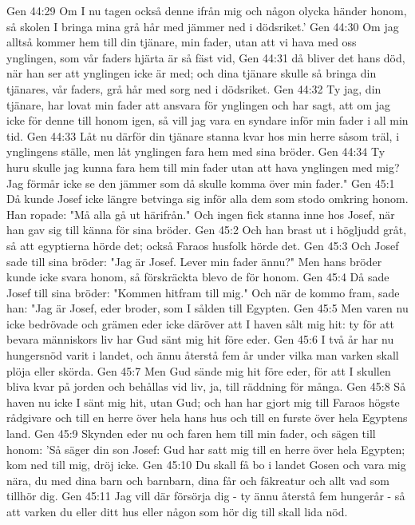 Gen 44:29  Om I nu tagen också denne ifrån mig och någon olycka händer honom, så skolen I bringa mina grå hår med jämmer ned i dödsriket.'
Gen 44:30  Om jag alltså kommer hem till din tjänare, min fader, utan att vi hava med oss ynglingen, som vår faders hjärta är så fäst vid,
Gen 44:31  då bliver det hans död, när han ser att ynglingen icke är med; och dina tjänare skulle så bringa din tjänares, vår faders, grå hår med sorg ned i dödsriket.
Gen 44:32  Ty jag, din tjänare, har lovat min fader att ansvara för ynglingen och har sagt, att om jag icke för denne till honom igen, så vill jag vara en syndare inför min fader i all min tid.
Gen 44:33  Låt nu därför din tjänare stanna kvar hos min herre såsom träl, i ynglingens ställe, men låt ynglingen fara hem med sina bröder.
Gen 44:34  Ty huru skulle jag kunna fara hem till min fader utan att hava ynglingen med mig? Jag förmår icke se den jämmer som då skulle komma över min fader."
Gen 45:1  Då kunde Josef icke längre betvinga sig inför alla dem som stodo omkring honom. Han ropade: "Må alla gå ut härifrån." Och ingen fick stanna inne hos Josef, när han gav sig till känna för sina bröder.
Gen 45:2  Och han brast ut i högljudd gråt, så att egyptierna hörde det; också Faraos husfolk hörde det.
Gen 45:3  Och Josef sade till sina bröder: "Jag är Josef. Lever min fader ännu?" Men hans bröder kunde icke svara honom, så förskräckta blevo de för honom.
Gen 45:4  Då sade Josef till sina bröder: "Kommen hitfram till mig." Och när de kommo fram, sade han: "Jag är Josef, eder broder, som I sålden till Egypten.
Gen 45:5  Men varen nu icke bedrövade och grämen eder icke däröver att I haven sålt mig hit: ty för att bevara människors liv har Gud sänt mig hit före eder.
Gen 45:6  I två år har nu hungersnöd varit i landet, och ännu återstå fem år under vilka man varken skall plöja eller skörda.
Gen 45:7  Men Gud sände mig hit före eder, för att I skullen bliva kvar på jorden och behållas vid liv, ja, till räddning för många.
Gen 45:8  Så haven nu icke I sänt mig hit, utan Gud; och han har gjort mig till Faraos högste rådgivare och till en herre över hela hans hus och till en furste över hela Egyptens land.
Gen 45:9  Skynden eder nu och faren hem till min fader, och sägen till honom: 'Så säger din son Josef: Gud har satt mig till en herre över hela Egypten; kom ned till mig, dröj icke.
Gen 45:10  Du skall få bo i landet Gosen och vara mig nära, du med dina barn och barnbarn, dina får och fäkreatur och allt vad som tillhör dig.
Gen 45:11  Jag vill där försörja dig - ty ännu återstå fem hungerår - så att varken du eller ditt hus eller någon som hör dig till skall lida nöd.
